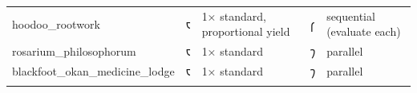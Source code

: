 \begin{longtable}[]{@{}lllll@{}}
\begin{minipage}[t]{0.17\columnwidth}\raggedright
hoodoo\_rootwork\strut
\end{minipage} & \begin{minipage}[t]{0.17\columnwidth}\raggedright
𐑱\strut
\end{minipage} & \begin{minipage}[t]{0.17\columnwidth}\raggedright
1× standard, proportional yield\strut
\end{minipage} & \begin{minipage}[t]{0.17\columnwidth}\raggedright
𐑝\strut
\end{minipage} & \begin{minipage}[t]{0.17\columnwidth}\raggedright
sequential (evaluate each)\strut
\end{minipage}\tabularnewline
\begin{minipage}[t]{0.17\columnwidth}\raggedright
rosarium\_philosophorum\strut
\end{minipage} & \begin{minipage}[t]{0.17\columnwidth}\raggedright
𐑱\strut
\end{minipage} & \begin{minipage}[t]{0.17\columnwidth}\raggedright
1× standard\strut
\end{minipage} & \begin{minipage}[t]{0.17\columnwidth}\raggedright
𐑠\strut
\end{minipage} & \begin{minipage}[t]{0.17\columnwidth}\raggedright
parallel\strut
\end{minipage}\tabularnewline
\begin{minipage}[t]{0.17\columnwidth}\raggedright
blackfoot\_okan\_medicine\_lodge\strut
\end{minipage} & \begin{minipage}[t]{0.17\columnwidth}\raggedright
𐑱\strut
\end{minipage} & \begin{minipage}[t]{0.17\columnwidth}\raggedright
1× standard\strut
\end{minipage} & \begin{minipage}[t]{0.17\columnwidth}\raggedright
𐑠\strut
\end{minipage} & \begin{minipage}[t]{0.17\columnwidth}\raggedright
parallel\strut
\end{minipage}\tabularnewline
\begin{minipage}[t]{0.17\columnwidth}\raggedright

\end{minipage}
\end{longtable}
